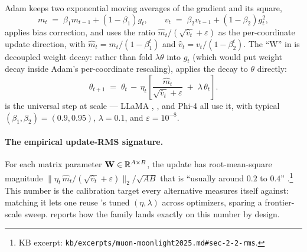Adam \citep[Kingma \&
Ba 2015]{muon-moonlight2025} keeps two exponential moving averages of the
gradient and its square,
\begin{equation}
m_t \;=\; \beta_1 m_{t-1} + (1 - \beta_1) g_t, \qquad
v_t \;=\; \beta_2 v_{t-1} + (1 - \beta_2) g_t^2,
\label{eq:adam-moments}
\end{equation}
applies bias correction, and uses the ratio
$\hat{m}_t / (\sqrt{\hat{v}_t} + \varepsilon)$ as the per-coordinate
update direction, with $\hat{m}_t = m_t / (1 - \beta_1^t)$ and
$\hat{v}_t = v_t / (1 - \beta_2^t)$. The ``W'' in 
\citep[Loshchilov \&
Hutter 2019]{muon-moonlight2025} is decoupled weight
decay: rather than fold $\lambda \theta$ into $g_t$ (which would put
weight decay inside Adam's per-coordinate rescaling),  applies
the decay to $\theta$ directly:
\begin{equation}
\theta_{t+1} \;=\; \theta_t \,-\, \eta_t \!\left[
   \frac{\hat{m}_t}{\sqrt{\hat{v}_t} + \varepsilon} \;+\; \lambda\,\theta_t
\right].
\label{eq:adamw}
\tag{2}
\end{equation}
 is the universal  step at  scale --- LLaMA
\citep{meta-llama3},  \citep[\S 4]{deepseek-v3}, and Phi-4
\citep{phi4} all use it, with typical
$(\beta_1, \beta_2) = (0.9, 0.95)$, $\lambda = 0.1$, and $\varepsilon
= 10^{-8}$.

\paragraph{The empirical update-RMS signature.}
For each matrix parameter $\mathbf{W} \in \mathbb{R}^{A \times B}$, the 
update has root-mean-square magnitude
$\| \eta_t \, \hat{m}_t / (\sqrt{\hat{v}_t} + \varepsilon) \|_2 /
\sqrt{AB}$ that is ``usually around $0.2$ to $0.4$'' \citep[\S
2.2]{muon-moonlight2025}.\footnote{KB excerpt:
\nolinkurl{kb/excerpts/muon-moonlight2025.md#sec-2-2-rms}.} This number
is the calibration target every alternative measures itself against:
matching it lets one reuse 's tuned $(\eta, \lambda)$ across
optimizers, sparing a frontier-scale sweep. 
reports how the  family lands exactly on this number by design.

